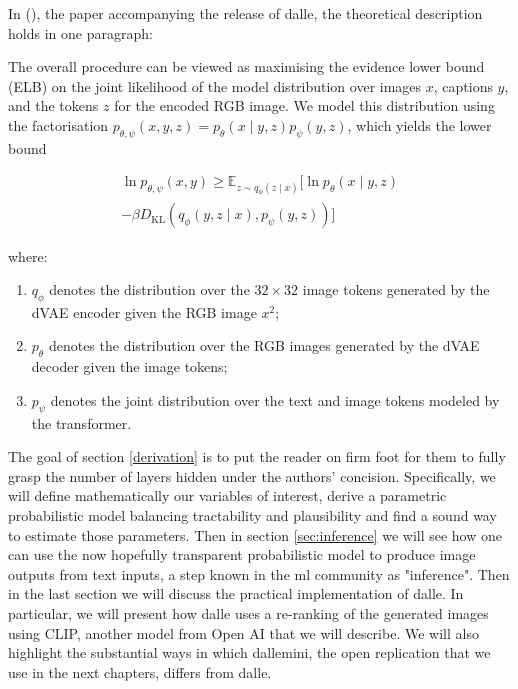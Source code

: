 \documentclass{article}
\begin{document}
\begin{multicols}{2}

In  (\cite{zeroshot}), the paper accompanying the release of \gls{dalle}, the theoretical description holds in one paragraph:


\begin{displayquote}
The overall procedure can be viewed as maximising the evidence lower bound (ELB) on the joint likelihood of the model distribution over images $x$, captions $y$, and the tokens $z$ for the encoded RGB image. We model this distribution using the factorisation $p_{\theta, \psi}(x, y, z)=p_{\theta}(x \mid y, z) p_{\psi}(y, z)$, which yields the lower bound

$$
\begin{aligned} \label{eq:elb_theirs}
\ln p_{\theta, \psi}(x, y) \geqslant  \mathbb{E}_{z \sim q_{\phi}(z \mid x)} \Big[\ln p_{\theta}(x \mid y, z)\\
-\beta D_{\mathrm{KL}}\left(q_{\phi}(y, z \mid x), p_{\psi}(y, z)\right)\Big]
\end{aligned}
$$

where:
\begin{enumerate}
    \item $q_{\phi}$ denotes the distribution over the $32 \times 32$ image tokens generated by the dVAE encoder given the RGB image $x^{2}$;
    \item $p_{\theta}$ denotes the distribution over the RGB images generated by the dVAE decoder given the image tokens; 
    \item $p_{\psi}$ denotes the joint distribution over the text and image tokens modeled by the transformer.
\end{enumerate}
\end{displayquote}

The goal of section \ref{derivation} is to put the reader on firm foot for them to fully grasp the number of layers hidden under the authors' concision. Specifically, we will define mathematically our variables of interest, derive a parametric probabilistic model balancing tractability and plausibility and find a sound way to estimate those parameters. Then in section \ref{sec:inference} we will see how one can use the now hopefully transparent probabilistic model to produce image outputs from text inputs, a step known in the \gls{ml} community as "inference". Then in the last section we will discuss the practical implementation of \gls{dalle}. In particular, we will present how \gls{dalle} uses a re-ranking of the generated images using CLIP, another model from Open AI that we will describe. We will also highlight the substantial ways in which \gls{dallemini}, the open replication that we use in the next chapters, differs from \gls{dalle}.


\end{multicols}
\end{document}
